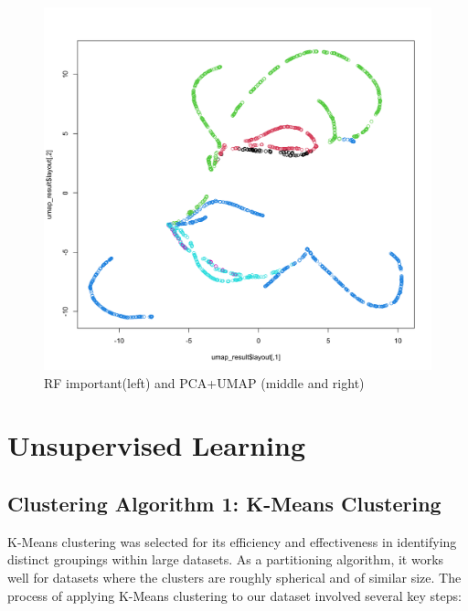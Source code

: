 \documentclass[8pt]{report}
\begin{document}
\begin{figure}[H]
    \includegraphics*[scale=0.07]{figures/UMAP_PAC2.png}
    \caption{RF important(left) and PCA+UMAP (middle and right)}
    \label{fig:RF_PCA_and_UMAP}
\end{figure}


\section{Unsupervised Learning}

\subsection{Clustering Algorithm 1: K-Means Clustering}
K-Means clustering was selected for its efficiency and effectiveness in identifying distinct groupings within large datasets. As a partitioning algorithm, it works well for datasets where the clusters are roughly spherical and of similar size. 
The process of applying K-Means clustering to our dataset involved several key steps:
\end{document}
